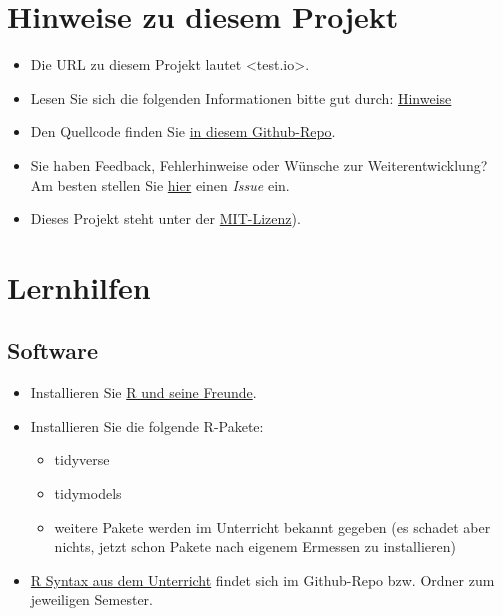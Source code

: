 \documentclass[
]{book}
\providecommand{\tightlist}{%
  \setlength{\itemsep}{0pt}\setlength{\parskip}{0pt}}
\begin{document}
\hypertarget{hinweise-zu-diesem-projekt}{%
\section{Hinweise zu diesem Projekt}\label{hinweise-zu-diesem-projekt}}

\begin{itemize}
\item
  Die URL zu diesem Projekt lautet \textless test.io\textgreater.
\item
  Lesen Sie sich die folgenden Informationen bitte gut durch: \href{https://sebastiansauer.github.io/fopra/Interna/Hinweise.html}{Hinweise}
\item
  Den Quellcode finden Sie \href{https://github.com/sebastiansauer/datascience1}{in diesem Github-Repo}.
\item
  Sie haben Feedback, Fehlerhinweise oder Wünsche zur Weiterentwicklung? Am besten stellen Sie \href{https://github.com/sebastiansauer/datascience1/issues}{hier} einen \emph{Issue} ein.
\item
  Dieses Projekt steht unter der \href{https://github.com/sebastiansauer/datascience1/blob/main/LICENSE}{MIT-Lizenz}).
\end{itemize}

\hypertarget{lernhilfen}{%
\section{Lernhilfen}\label{lernhilfen}}

\hypertarget{software}{%
\subsection{Software}\label{software}}

\begin{itemize}
\tightlist
\item
  Installieren Sie \href{https://data-se.netlify.app/2021/11/30/installation-von-r-und-seiner-freunde/}{R und seine Freunde}.
\item
  Installieren Sie die folgende R-Pakete:

  \begin{itemize}
  \tightlist
  \item
    tidyverse
  \item
    tidymodels
  \item
    weitere Pakete werden im Unterricht bekannt gegeben (es schadet aber nichts, jetzt schon Pakete nach eigenem Ermessen zu installieren)
  \end{itemize}
\item
  \href{https://github.com/sebastiansauer/Lehre}{R Syntax aus dem Unterricht} findet sich im Github-Repo bzw. Ordner zum jeweiligen Semester.
\end{itemize}
\end{document}
